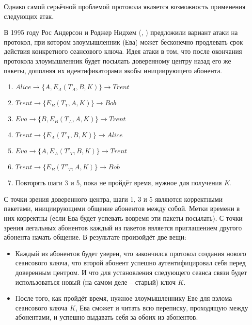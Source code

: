 Однако самой серьёзной проблемой протокола является возможность применения следующих атак.

В 1995 году Рос Андерсон и Роджер Нидхем (, \cite{Anderson:Needham:1995}) предложили вариант атаки на протокол, при котором злоумышленник (Ева) может бесконечно продлевать срок действия конкретного сеансового ключа. Идея атаки в том, что после окончания протокола злоумышленник будет посылать доверенному центру назад его же пакеты, дополняя их идентификаторами якобы инициирующего абонента.

\begin{enumerate}
	\item $ Alice \rightarrow \{ A, E_A \left( T_A, B, K \right) \} \rightarrow Trent $
	\item $ Trent \rightarrow \{ E_B \left( T_T, A, K \right) \} \rightarrow Bob $
	\item $ Eva \rightarrow \{ B, E_B \left( T_A, A, K \right) \} \rightarrow Trent $
	\item $ Trent \rightarrow \{ E_A \left( T'_T, B, K \right) \} \rightarrow Alice $
	\item $ Eva \rightarrow \{ A, E_A \left( T'_T, B, K \right) \} \rightarrow Trent $
	\item $ Trent \rightarrow \{ E_B \left( T''_T, A, K \right) \} \rightarrow Bob $
	\item Повторять шаги 3 и 5, пока не пройдёт время, нужное для получения $K$.
\end{enumerate}

С точки зрения доверенного центра, шаги 1, 3 и 5 являются корректными пакетами, инициирующими общение абонентов между собой. Метки времени в них корректны (если Ева будет успевать вовремя эти пакеты посылать). С точки зрения легальных абонентов каждый из пакетов является приглашением другого абонента начать общение. В результате произойдёт две вещи:

\begin{itemize}
	\item Каждый из абонентов будет уверен, что закончился протокол создания нового сеансового ключа, что второй абонент успешно аутентифицировал себя перед доверенным центром. И что для установления следующего сеанса связи будет использоваться новый (на самом деле -- старый) ключ $K$.
	\item После того, как пройдёт время, нужное злоумышленнику Еве для взлома сеансового ключа $K$, Ева сможет и читать всю переписку, проходящую между абонентами, и успешно выдавать себя за обоих из абонентов.
\end{itemize}

